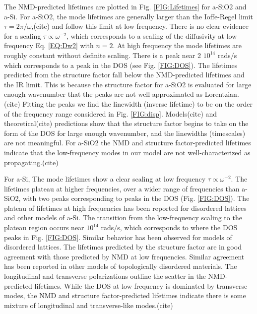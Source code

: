 \documentclass[aps,prb,twocolumn,superscriptaddress,footinbib,amsmath,amssymb,floatfix]{revtex4}
\begin{document}
The NMD-predicted lifetimes are plotted in Fig. \ref{FIG:Lifetimes} 
for a-SiO2 and a-Si. 
For a-SiO2, the mode lifetimes are generally larger than 
the Ioffe-Regel limit $\tau = 2\pi/\omega$,(cite) and follow 
this limit at low frequency. There is no clear evidence for a
scaling $\tau\propto\omega^{-2}$, which 
corresponds to a scaling of the diffusivity at low 
frequency Eq. \eqref{EQ:Dw2} with $n=2$.  
At high frequency the mode lifetimes are roughly constant 
without definite scaling. There is a peak near 
2 $10^{14}$ rads$/$s which corresponds to a peak in the DOS 
(see Fig. \ref{FIG:DOS}).  The lifetimes predicted from the 
structure factor fall below the NMD-predicted lifetimes 
and the IR limit. This is because the structure factor for 
a-SiO2 is evaluated for large enough wavenumber that the 
peaks are not well-approximated as Lorentzian.(cite) Fitting 
the peaks we find the linewidth (inverse lifetime) 
to be on the order of the frequency range considered in 
Fig. \ref{FIG:disp}. 
Models(cite) and theoretical(cite) predictions show that the 
structure factor begins to take on the form of the DOS 
for large enough wavenumber,
\cite{martin-mayor_dynamical_2001,baldi_thermal_2008} and the 
linewidths (timescales) are not meaningful. For a-SiO2 the NMD and 
structure factor-predicted lifetimes indicate that the 
low-frequency modes 
in our model are not well-characterized as propagating.(cite)  

For a-Si, 
The mode lifetimes show a clear scaling at low frequency 
$\tau\propto\omega^{-2}$. The lifetimes plateau at higher frequencies,
over a wider range of frequencies than a-SiO2, with two peaks 
corresponding to peaks in the DOS (Fig. \ref{FIG:DOS}). The plateau of 
lifetimes at high frequencies has been 
reported for disordered lattices
\cite{sheng_heat_1991,larkin_predicting_2013} and 
other models of a-Si.\cite{he_heat_2011} 
The transition from the low-frequency scaling to 
the plateau region occurs near 
$10^{14}$ rads$/$s, which corresponds to where the DOS peaks in Fig. 
\ref{FIG:DOS}. 
Similar behavior has been observed for models of disordered lattices.
\cite{larkin_predicting_2013} The lifetimes predicted by the 
structure factor are in good agreement with those predicted by NMD 
at low frequencies. Similar agreement has been reported in other 
models of topologically disordered materials.
\cite{mazzacurati_low-frequency_1996} 
The longitudinal and transverse polarizations 
outline the scatter in the NMD-predicted lifetimes. While the DOS 
at low frequency is 
dominated by transverse modes, the NMD and 
structure factor-predicted lifetimes indicate there 
is some mixture of longitudinal and transverse-like modes.(cite) 
\end{document}

